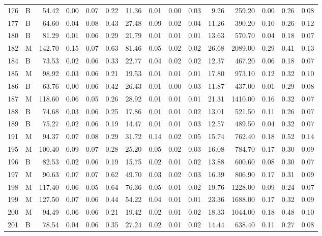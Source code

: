 \begin{table}[ht]
\begin{tabular}{rlrrrrrrrrrrrrr}
  176 & B & 54.42 & 0.00 & 0.07 & 0.22 & 11.36 & 0.01 & 0.00 & 0.03 & 9.26 & 259.20 & 0.00 & 0.26 & 0.08 \\ 
  177 & B & 64.60 & 0.04 & 0.08 & 0.43 & 27.48 & 0.09 & 0.02 & 0.04 & 11.26 & 390.20 & 0.10 & 0.26 & 0.12 \\ 
  180 & B & 81.29 & 0.01 & 0.06 & 0.29 & 21.79 & 0.01 & 0.01 & 0.01 & 13.63 & 570.70 & 0.04 & 0.18 & 0.07 \\ 
  182 & M & 142.70 & 0.15 & 0.07 & 0.63 & 81.46 & 0.05 & 0.02 & 0.02 & 26.68 & 2089.00 & 0.29 & 0.41 & 0.13 \\ 
  184 & B & 73.53 & 0.02 & 0.06 & 0.33 & 22.77 & 0.04 & 0.02 & 0.02 & 12.37 & 467.20 & 0.06 & 0.18 & 0.07 \\ 
  185 & M & 98.92 & 0.03 & 0.06 & 0.21 & 19.53 & 0.01 & 0.01 & 0.01 & 17.80 & 973.10 & 0.12 & 0.32 & 0.10 \\ 
  186 & B & 63.76 & 0.00 & 0.06 & 0.42 & 26.43 & 0.01 & 0.00 & 0.03 & 11.87 & 437.00 & 0.01 & 0.29 & 0.08 \\ 
  187 & M & 118.60 & 0.06 & 0.05 & 0.26 & 28.92 & 0.01 & 0.01 & 0.01 & 21.31 & 1410.00 & 0.16 & 0.32 & 0.07 \\ 
  188 & B & 74.68 & 0.03 & 0.06 & 0.25 & 17.86 & 0.01 & 0.01 & 0.02 & 13.01 & 521.50 & 0.11 & 0.26 & 0.07 \\ 
  189 & B & 75.27 & 0.02 & 0.06 & 0.19 & 14.47 & 0.01 & 0.01 & 0.03 & 12.57 & 489.50 & 0.04 & 0.32 & 0.07 \\ 
  191 & M & 94.37 & 0.07 & 0.08 & 0.29 & 31.72 & 0.14 & 0.02 & 0.05 & 15.74 & 762.40 & 0.18 & 0.52 & 0.14 \\ 
  195 & M & 100.40 & 0.09 & 0.07 & 0.28 & 25.20 & 0.05 & 0.02 & 0.03 & 16.08 & 784.70 & 0.17 & 0.30 & 0.09 \\ 
  196 & B & 82.53 & 0.02 & 0.06 & 0.19 & 15.75 & 0.02 & 0.01 & 0.02 & 13.88 & 600.60 & 0.08 & 0.30 & 0.07 \\ 
  197 & M & 90.63 & 0.07 & 0.07 & 0.62 & 49.70 & 0.03 & 0.02 & 0.03 & 16.39 & 806.90 & 0.17 & 0.31 & 0.09 \\ 
  198 & M & 117.40 & 0.06 & 0.05 & 0.64 & 76.36 & 0.05 & 0.01 & 0.02 & 19.76 & 1228.00 & 0.09 & 0.24 & 0.07 \\ 
  199 & M & 127.50 & 0.07 & 0.06 & 0.44 & 54.22 & 0.04 & 0.01 & 0.01 & 23.36 & 1688.00 & 0.17 & 0.32 & 0.09 \\ 
  200 & M & 94.49 & 0.06 & 0.06 & 0.21 & 19.42 & 0.02 & 0.01 & 0.02 & 18.33 & 1044.00 & 0.18 & 0.48 & 0.10 \\ 
  201 & B & 78.54 & 0.04 & 0.06 & 0.35 & 27.24 & 0.02 & 0.01 & 0.02 & 14.44 & 638.40 & 0.11 & 0.27 & 0.08 \\ 

\end{tabular}
\end{table}
